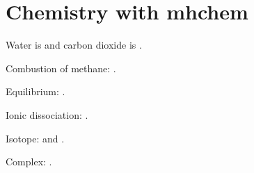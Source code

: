 \documentclass{article}
\begin{document}
\section{Chemistry with mhchem}

Water is  and carbon dioxide is .

Combustion of methane: .

Equilibrium: .

Ionic dissociation: .

Isotope:  and .

Complex: .
\end{document}
